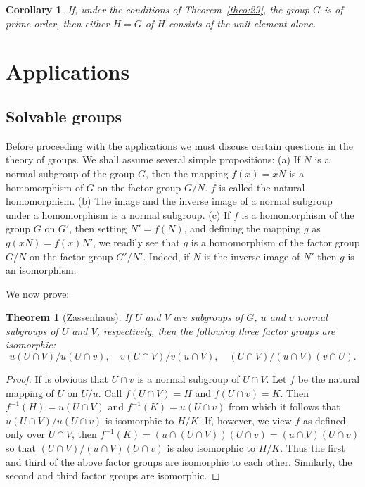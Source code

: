 \documentclass[10pt,leqno]{article}
\newtheorem{theo}{Theorem}
\newtheorem*{coro*}{Corollary}
\theoremstyle{definition}
\begin{document}
\begin{coro*}
If, under the conditions of Theorem~\ref{theo:29}, the group $G$ is of prime order, then either $H = G$ of $H$ consists of the unit element alone.
\end{coro*}




\section{Applications}

\setcounter{theo}{0}
\setcounter{coro}{0}


\subsection{Solvable groups}

Before proceeding with the applications we must discuss certain questions in the theory of groups.
We shall assume several simple propositions:
(a) If $N$ is a normal subgroup of the group $G$, then the mapping $f(x) = xN$ is a homomorphism of $G$ on the factor group $G/N$.
$f$ is called the natural homomorphism.
(b) The image and the inverse image of a normal subgroup under a homomorphism is a normal subgroup.
(c) If $f$ is a homomorphism of the group $G$ on $G'$, then setting $N' = f(N)$, and defining the mapping $g$ as $g(xN) = f(x) N'$, we readily see that $g$ is a homomorphism of the factor group $G/N$ on the factor group $G'/N'$.
Indeed, if $N$ is the inverse image of $N'$ then $g$ is an isomorphism.

We now prove:


\begin{theo}[Zassenhaus]
\label{theo:III.1}
If $U$ and $V$ are subgroups of $G$, $u$ and $v$ normal subgroups of $U$ and $V$, respectively, then the following three factor groups are isomorphic:
\[
u( U \cap V) / u(U \cap v),
\quad
v(U \cap V) / v(u \cap V),
\quad
(U \cap V)/ (u \cap V) (v \cap U).
\]
\end{theo}


\begin{proof}
If is obvious that $U \cap v$ is a normal subgroup of $U \cap V$.
Let $f$ be the natural mapping of $U$ on $U / u$.
Call $f(U \cap V) = H$ and $f(U \cap v) = K$.
Then $f^{-1}(H) = u(U \cap V)$ and $f^{-1}(K) = u(U \cap v)$ from which it follows that $u(U \cap V) / u(U \cap v)$ is isomorphic to $H / K$.
If, however, we view $f$ as defined only over $U \cap V$, then $f^{-1}(K) = ( u \cap (U \cap V) ) (U \cap v) = (u \cap V)(U \cap v)$ so that $(U \cap V) / (u \cap V)(U \cap v)$ is also isomorphic to $H/K$.
Thus the first and third of the above factor groups are isomorphic to each other.
Similarly, the second and third factor groups are isomorphic.
\end{proof}
\end{document}
